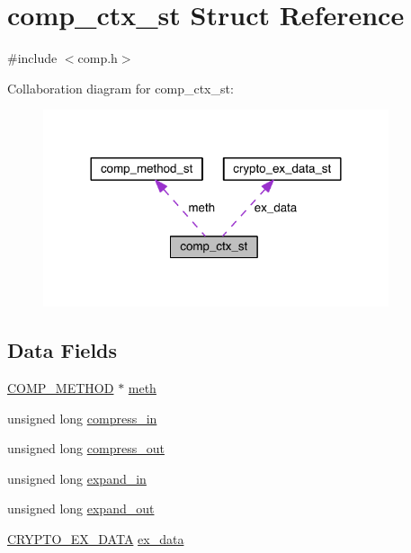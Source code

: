 \hypertarget{structcomp__ctx__st}{}\section{comp\+\_\+ctx\+\_\+st Struct Reference}
\label{structcomp__ctx__st}


{\ttfamily \#include $<$comp.\+h$>$}



Collaboration diagram for comp\+\_\+ctx\+\_\+st\+:\nopagebreak
\begin{figure}[H]
\begin{center}
\leavevmode
\includegraphics[width=288pt]{structcomp__ctx__st__coll__graph}
\end{center}
\end{figure}
\subsection*{Data Fields}
\begin{DoxyCompactItemize}
\item 
\hyperlink{crypto_2ossl__typ_8h_a9f90390c950298b1f28bfd30c93234ef}{C\+O\+M\+P\+\_\+\+M\+E\+T\+H\+OD} $\ast$ \hyperlink{structcomp__ctx__st_a472fdf81e6f3f58725ff5edc9f29c87e}{meth}
\item 
unsigned long \hyperlink{structcomp__ctx__st_a7510b41bc217b99eafcabb1eed892cb9}{compress\+\_\+in}
\item 
unsigned long \hyperlink{structcomp__ctx__st_a6e77ea6b7bbc41269009e13610c89d4a}{compress\+\_\+out}
\item 
unsigned long \hyperlink{structcomp__ctx__st_a81c59ddb803ee0b98d2e7142bbd388a6}{expand\+\_\+in}
\item 
unsigned long \hyperlink{structcomp__ctx__st_a32fcdc165a84c8e8b8857933456e14e5}{expand\+\_\+out}
\item 
\hyperlink{crypto_2ossl__typ_8h_a7eaff1c18057495d8af18f22d1370b51}{C\+R\+Y\+P\+T\+O\+\_\+\+E\+X\+\_\+\+D\+A\+TA} \hyperlink{structcomp__ctx__st_ac3e4fd59d6ee44a81f3a58114613c1e2}{ex\+\_\+data}
\end{DoxyCompactItemize}


